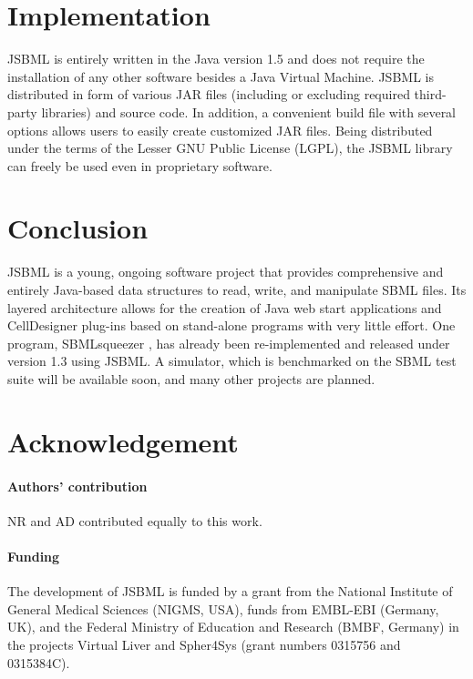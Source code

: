 \documentclass{bioinfo}
\begin{document}
\section{Implementation}

JSBML is entirely written in the Java\texttrademark{} version 1.5 and does
not require the installation of any other software besides a Java Virtual
Machine.
JSBML is distributed in form of various JAR files (including or excluding
required third-party libraries) and source code. In addition, a convenient build
file with several options allows users to easily create customized JAR files.
Being distributed under the terms of the Lesser GNU Public License (LGPL), the
JSBML library can freely be used even in proprietary software.



\section{Conclusion}

JSBML is a young, ongoing software project that provides comprehensive and
entirely Java-based data structures to read, write, and manipulate SBML files.
Its layered architecture allows for the creation of Java web start applications
and CellDesigner plug-ins based on stand-alone programs with very little effort.
%
One program, SBMLsqueezer \citep{Draeger2008}, has already been re-implemented
and released under version 1.3 using JSBML. A simulator, which is benchmarked
on the SBML test suite will be available soon, and many other projects are
planned.

\section*{Acknowledgement}

\paragraph{Authors' contribution\textcolon} NR and AD contributed equally to
this work.

\paragraph{Funding\textcolon}
The development of JSBML is funded by a grant from the National Institute of
General Medical Sciences (NIGMS, USA), funds from EMBL-EBI (Germany, UK), and
the Federal Ministry of Education and Research (BMBF, Germany) in the projects
Virtual Liver and Spher4Sys (grant numbers 0315756 and 0315384C).
\end{document}
